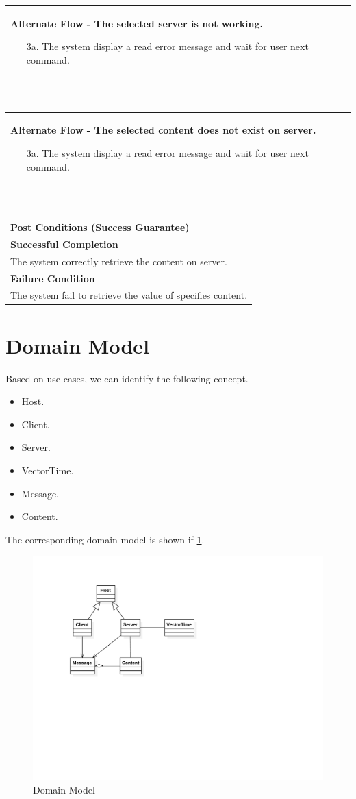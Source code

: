 \documentclass[11pt,letterpaper,en-US]{article}
\begin{document}
\begin{tabularx}{\textwidth}{X}
    \textbf{Alternate Flow - The selected server is not working.}
    \begin{itemize}
        \item[3a.] The system display a read error message and wait for user next command.
    \end{itemize}
\end{tabularx}\\
\begin{tabularx}{\textwidth}{X}
    \textbf{Alternate Flow - The selected content does not exist on server.}
    \begin{itemize}
        \item[3a.] The system display a read error message and wait for user next command.
    \end{itemize}
\end{tabularx}\\
\begin{tabularx}{\textwidth}{X}
\textbf{Post Conditions (Success Guarantee)}\\
\textbf{Successful Completion} \\
\qquad The system correctly retrieve the content on server.\\
\textbf{Failure Condition} \\
\qquad The system fail to retrieve the value of specifies content.
\end{tabularx}

\section{Domain Model}
Based on use cases, we can identify the following concept.
\begin{itemize}
    \item Host.
    \item Client.
    \item Server.
    \item VectorTime.
    \item Message.
    \item Content.
\end{itemize}
The corresponding domain model is shown if \cref{domainm}.

\begin{figure}[h]
    \caption{Domain Model}\label{domainm}
    \centering
    \includegraphics[width=.6\textwidth]{domainmodel}
\end{figure}
\end{document}
